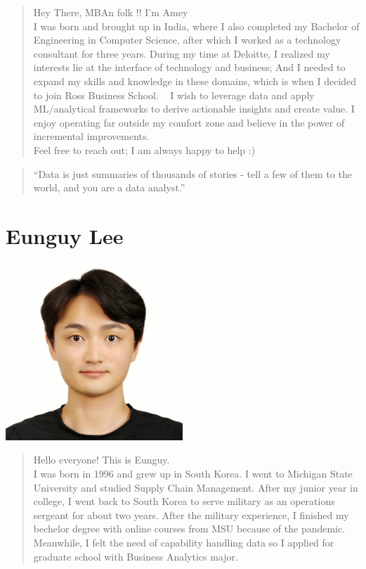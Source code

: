 \documentclass[
]{book}
\begin{document}
\begin{quote}
Hey There, MBAn folk !! I'm Amey\\
I was born and brought up in India, where I also completed my Bachelor of Engineering in Computer Science, after which I worked as a technology consultant for three years. During my time at Deloitte, I realized my interests lie at the interface of technology and business; And I needed to expand my skills and knowledge in these domains, which is when I decided to join Ross Business School. ~
I wish to leverage data and apply ML/analytical frameworks to derive actionable insights and create value. I enjoy operating far outside my comfort zone and believe in the power of incremental improvements.\\
Feel free to reach out; I am always happy to help :)
\end{quote}

\begin{quote}
``Data is just summaries of thousands of stories - tell a few of them to the world, and you are a data analyst.''
\end{quote}

\hypertarget{eunguy-lee}{%
\section{Eunguy Lee}\label{eunguy-lee}}

\includegraphics[width=0.5\textwidth,height=\textheight]{1651691637018.jpg}

\begin{quote}
Hello everyone! This is Eunguy.\\
I was born in 1996 and grew up in South Korea. I went to Michigan State University and studied Supply Chain Management. After my junior year in college, I went back to South Korea to serve military as an operations sergeant for about two years. After the military experience, I finished my bechelor degree with online courses from MSU because of the pandemic. Meanwhile, I felt the need of capability handling data so I applied for graduate school with Business Analytics major.
\end{quote}
\end{document}
